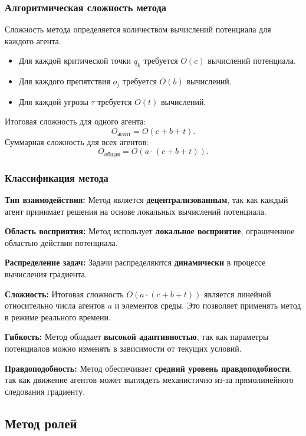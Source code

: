 \subsubsection*{Алгоритмическая сложность метода}
Сложность метода определяется количеством вычислений потенциала для каждого агента.  
\begin{itemize}
	\item Для каждой критической точки $q_k$ требуется $O(c)$ вычислений потенциала.
	\item Для каждого препятствия $o_j$ требуется $O(b)$ вычислений.
	\item Для каждой угрозы $\tau$ требуется $O(t)$ вычислений.
\end{itemize}
Итоговая сложность для одного агента:
\begin{equation}
	O_{\text{агент}} = O(c + b + t).
\end{equation}
Суммарная сложность для всех агентов:
\begin{equation}
	O_{\text{общая}} = O(a \cdot (c + b + t)).
\end{equation}

\subsubsection*{Классификация метода}
\textbf{Тип взаимодействия:}  
Метод является \textbf{децентрализованным}, так как каждый агент принимает решения на основе локальных вычислений потенциала.  

\textbf{Область восприятия:}  
Метод использует \textbf{локальное восприятие}, ограниченное областью действия потенциала.  

\textbf{Распределение задач:}  
Задачи распределяются \textbf{динамически} в процессе вычисления градиента.  

\textbf{Сложность:}  
Итоговая сложность $O(a \cdot (c + b + t))$ является линейной относительно числа агентов $a$ и элементов среды.
Это позволяет применять метод в режиме реального времени.  

\textbf{Гибкость:}  
Метод обладает \textbf{высокой адаптивностью}, так как параметры потенциалов можно изменять в зависимости от текущих условий.  

\textbf{Правдоподобность:}  
Метод обеспечивает \textbf{средний уровень правдоподобности}, так как движение агентов может выглядеть механистично из-за прямолинейного следования градиенту.

\subsection{Метод ролей}

